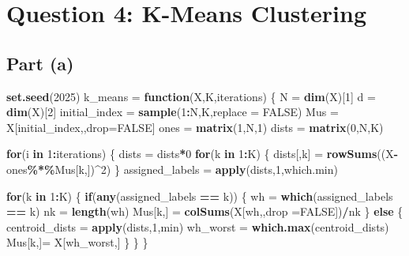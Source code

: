 \documentclass[12pt,halfline,a4paper,]{ouparticle}
\newenvironment{Shaded}{\begin{snugshade}}{\end{snugshade}}
\newcommand{\AttributeTok}[1]{\textcolor[rgb]{0.13,0.29,0.53}{#1}}
\newcommand{\ConstantTok}[1]{\textcolor[rgb]{0.56,0.35,0.01}{#1}}
\newcommand{\ControlFlowTok}[1]{\textcolor[rgb]{0.13,0.29,0.53}{\textbf{#1}}}
\newcommand{\DecValTok}[1]{\textcolor[rgb]{0.00,0.00,0.81}{#1}}
\newcommand{\FunctionTok}[1]{\textcolor[rgb]{0.13,0.29,0.53}{\textbf{#1}}}
\newcommand{\NormalTok}[1]{#1}
\newcommand{\OtherTok}[1]{\textcolor[rgb]{0.56,0.35,0.01}{#1}}
\newcommand{\SpecialCharTok}[1]{\textcolor[rgb]{0.81,0.36,0.00}{\textbf{#1}}}
\begin{document}
\section{Question 4: K-Means
Clustering}\label{question-4-k-means-clustering}

\subsection{Part (a)}\label{part-a-3}

\begin{Shaded}
\begin{Highlighting}[]
\FunctionTok{set.seed}\NormalTok{(}\DecValTok{2025}\NormalTok{) }
\NormalTok{k\_means }\OtherTok{=} \ControlFlowTok{function}\NormalTok{(X,K,iterations) \{}
\NormalTok{   N     }\OtherTok{=} \FunctionTok{dim}\NormalTok{(X)[}\DecValTok{1}\NormalTok{]}
\NormalTok{   d     }\OtherTok{=} \FunctionTok{dim}\NormalTok{(X)[}\DecValTok{2}\NormalTok{]}
\NormalTok{   initial\_index }\OtherTok{=} \FunctionTok{sample}\NormalTok{(}\DecValTok{1}\SpecialCharTok{:}\NormalTok{N,K,}\AttributeTok{replace =} \ConstantTok{FALSE}\NormalTok{) }
\NormalTok{   Mus   }\OtherTok{=}\NormalTok{  X[initial\_index,,drop}\OtherTok{=}\ConstantTok{FALSE}\NormalTok{] }
\NormalTok{   ones  }\OtherTok{=} \FunctionTok{matrix}\NormalTok{(}\DecValTok{1}\NormalTok{,N,}\DecValTok{1}\NormalTok{) }
\NormalTok{   dists }\OtherTok{=} \FunctionTok{matrix}\NormalTok{(}\DecValTok{0}\NormalTok{,N,K) }

   \ControlFlowTok{for}\NormalTok{(i }\ControlFlowTok{in} \DecValTok{1}\SpecialCharTok{:}\NormalTok{iterations) \{}
\NormalTok{      dists }\OtherTok{=}\NormalTok{ dists}\SpecialCharTok{*}\DecValTok{0}
      \ControlFlowTok{for}\NormalTok{(k }\ControlFlowTok{in} \DecValTok{1}\SpecialCharTok{:}\NormalTok{K) \{}
\NormalTok{           dists[,k] }\OtherTok{=} \FunctionTok{rowSums}\NormalTok{((X}\SpecialCharTok{{-}}\NormalTok{ones}\SpecialCharTok{\%*\%}\NormalTok{Mus[k,])}\SpecialCharTok{\^{}}\DecValTok{2}\NormalTok{) }
\NormalTok{      \}}
\NormalTok{      assigned\_labels }\OtherTok{=} \FunctionTok{apply}\NormalTok{(dists,}\DecValTok{1}\NormalTok{,which.min) }
      
      \ControlFlowTok{for}\NormalTok{(k }\ControlFlowTok{in} \DecValTok{1}\SpecialCharTok{:}\NormalTok{K) \{}
       \ControlFlowTok{if}\NormalTok{(}\FunctionTok{any}\NormalTok{(assigned\_labels }\SpecialCharTok{==}\NormalTok{ k)) \{}
\NormalTok{         wh }\OtherTok{=} \FunctionTok{which}\NormalTok{(assigned\_labels }\SpecialCharTok{==}\NormalTok{ k)}
\NormalTok{         nk }\OtherTok{=} \FunctionTok{length}\NormalTok{(wh)}
\NormalTok{         Mus[k,] }\OtherTok{=} \FunctionTok{colSums}\NormalTok{(X[wh,,}\AttributeTok{drop =}\ConstantTok{FALSE}\NormalTok{])}\SpecialCharTok{/}\NormalTok{nk}
\NormalTok{       \} }\ControlFlowTok{else}\NormalTok{ \{}
\NormalTok{         centroid\_dists }\OtherTok{=} \FunctionTok{apply}\NormalTok{(dists,}\DecValTok{1}\NormalTok{,min)}
\NormalTok{         wh\_worst }\OtherTok{=} \FunctionTok{which.max}\NormalTok{(centroid\_dists)}
\NormalTok{         Mus[k,]}\OtherTok{=}\NormalTok{ X[wh\_worst,]}
\NormalTok{       \}}
\NormalTok{      \}}
\NormalTok{   \}}
   

\end{Highlighting}
\end{Shaded}
\end{document}
